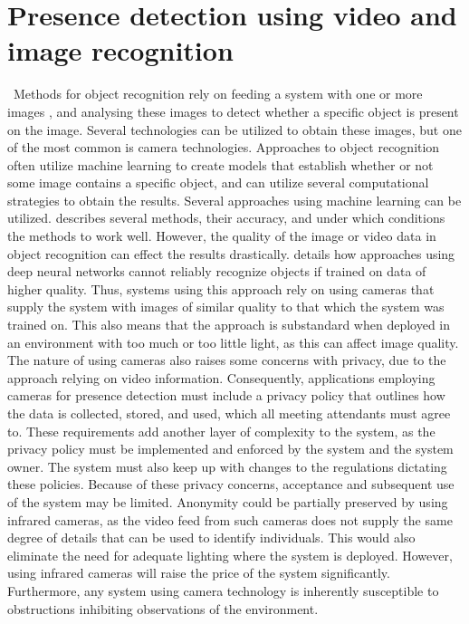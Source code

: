 \section{Presence detection using video and image recognition} \label{sec:video-based-detection}\
Methods for object recognition rely on feeding a system with one or more images \cite{huttenlocher1987object, computational_strategies_for_object_recog}, and analysing these images to detect whether a specific object is present on the image.
Several technologies can be utilized to obtain these images, but one of the most common is camera technologies\cite{FUERTES2022103473}. 
Approaches to object recognition often utilize machine learning to create models that establish whether or not some image contains a specific object\cite{huttenlocher1987object}, and can utilize several computational strategies to obtain the results\cite{computational_strategies_for_object_recog}. 
Several approaches using machine learning can be utilized. 
\citeauthor{object_recognision_survey} \cite{object_recognision_survey} describes several methods, their accuracy, and under which conditions the methods to work well. 
However, the quality of the image or video data in object recognition can effect the results drastically.
\citeauthor{vid_qual_affects} \cite{vid_qual_affects} details how approaches using deep neural networks cannot reliably recognize objects if trained on data of higher quality. 
Thus, systems using this approach rely on using cameras that supply the system with images of similar quality to that which the system was trained on.
This also means that the approach is substandard when deployed in an environment with too much or too little light, as this can affect image quality.  
The nature of using cameras also raises some concerns with privacy, due to the approach relying on video information. 
Consequently, applications employing cameras for presence detection must include a privacy policy that outlines how the data is collected, stored, and used, which all meeting attendants must agree to.
These requirements add another layer of complexity to the system, as the privacy policy must be implemented and enforced by the system and the system owner.
The system must also keep up with changes to the regulations dictating these policies.
Because of these privacy concerns, acceptance and subsequent use of the system may be limited\cite{granath_detecting_nodate, tang_occupancy_2020, privacyPreservingSensor}.
Anonymity could be partially preserved by using infrared cameras, as the video feed from such cameras does not supply the same degree of details that can be used to identify individuals. 
This would also eliminate the need for adequate lighting where the system is deployed.  
However, using infrared cameras will raise the price of the system significantly. 
Furthermore, any system using camera technology is inherently susceptible to obstructions inhibiting observations of the environment.

